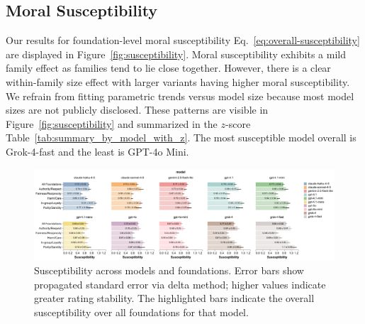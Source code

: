 \documentclass{article}
\begin{document}
\subsection{Moral Susceptibility}

Our results for foundation-level moral susceptibility Eq.~\ref{eq:overall-susceptibility} are displayed in Figure~\ref{fig:susceptibility}. Moral susceptibility exhibits a mild family effect as families tend to lie close together. However, there is a clear within-family size effect with larger variants having higher moral susceptibility. We refrain from fitting parametric trends versus model size because most model sizes are not publicly disclosed. These patterns are visible in Figure~\ref{fig:susceptibility} and summarized in the $z$-score Table~\ref{tab:summary_by_model_with_z}. The most susceptible model overall is Grok-4-fast and the least is GPT-4o Mini.


\begin{figure}[!t]
  \centering
  \includegraphics[width=0.9\linewidth]{../results/susceptibility_bars.pdf}\hfill
  \caption{Susceptibility across models and foundations. Error bars show propagated standard error via delta method; higher values indicate greater rating stability. The highlighted bars indicate the overall susceptibility over all foundations for that model.}
  \label{fig:susceptibility2}
\end{figure}
\end{document}
